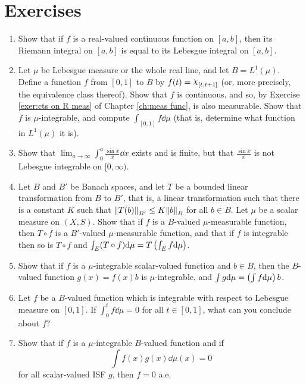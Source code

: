 \section{Exercises}
\begin{enumerate}[label=\arabic*),ref=\arabic*]
\item Show that if $f$ is a real-valued continuous function on $[a,b]$, then its Riemann integral on $[a,b]$ is equal to its Lebesgue integral on $[a,b]$.

\item \label{exer:integral of L1 func}
Let $\mu$ be Lebesgue measure or the whole real line, and let $B=L^1(\mu)$. Define a function $f$ from $[0,1]$ to $B$ by $f(t)=\idf{[t, t+1]}$ (or, more precisely, the equivalence class thereof). Show that $f$ is continuous, and so, by Exercise \ref{exer:cts on R meas} of Chapter \ref{ch:meas func}, is also measurable. Show that $f$ is $\mu$-integrable, and compute $\int_{[0,1]}f\dd\mu$ (that is, determine what function in $L^1(\mu)$ it is).

\item Show that $\lim _{a\to\infty}\int_0^a\frac{\sin x}{x}\dd x$ exists and is finite, but that $\frac{\sin x}{x}$ is not Lebesgue integrable on $[0,\infty)$.

\item \label{exer:integral compose linear functional}
Let $B$ and $B'$ be Banach spaces, and let $T$ be a bounded linear transformation from $B$ to $B'$, that is, a linear transformation such that there is a constant $K$ such that $\norm{T(b)}_{B'}\leq K\norm{b}_B$ for all $b\in B$. Let $\mu$ be a scalar measure on $(X,S)$. Show that if $f$ is a $B$-valued $\mu$-measurable function, then $T\circ f$ is a $B'$-valued $\mu$-measurable function, and that if $f$ is integrable then so is $T\circ f$ and $\int_E(T\circ f)\dd\mu=T\left(\int_Ef\dd\mu\right)$.

\item Show that if $f$ is a $\mu$-integrable scalar-valued function and $b\in B$, then the $B$-valued function $g(x)=f(x)b$ is $\mu$-integrable, and $\int g\dd\mu=\left(\int f\dd\mu\right)b$.

\item Let $f$ be a $B$-valued function which is integrable with respect to Lebesgue measure on $[0,1]$. If $\int_0^t f\dd\mu=0$ for all $t\in[0,1]$, what can you conclude about $f$?

\item Show that if $f$ is a $\mu$-integrable $B$-valued function and if $$\int f(x)g(x)\dd\mu(x)=0$$ for all scalar-valued ISF $g$, then $f=0$ a.e.


\end{enumerate}
